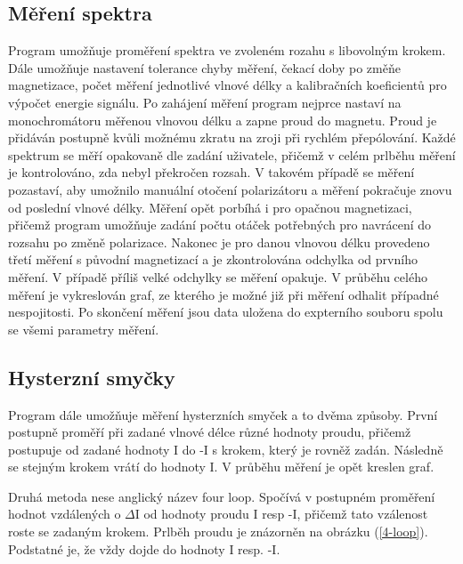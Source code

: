 \documentclass[a4paper,12pt]{article}
\begin{document}
\subsection{Měření spektra}
Program umožňuje proměření spektra ve zvoleném rozahu s libovolným krokem. Dále umožňuje nastavení tolerance chyby měření, čekací doby po změňe magnetizace, počet měření jednotlivé vlnové délky a kalibračních koeficientů pro výpočet energie signálu. Po zahájení měření program nejprce nastaví na monochromátoru měřenou vlnovou délku a zapne proud do magnetu. Proud je přidáván postupně kvůli možnému zkratu na zroji při rychlém přepólování. Každé spektrum se měří opakovaně dle zadání uživatele, přičemž v celém prlběhu měření je kontrolováno, zda nebyl překročen rozsah. V takovém případě se měření pozastaví, aby umožnilo manuální otočení polarizátoru a měření pokračuje znovu od poslední vlnové délky. Měření opět porbíhá i pro opačnou magnetizaci, přičemž program umožňuje zadání počtu otáček potřebných pro navrácení do rozsahu po změně polarizace. Nakonec je pro danou vlnovou délku provedeno třetí měření s původní magnetizací a je zkontrolována odchylka od prvního měření. V případě příliš velké odchylky se měření opakuje. V průběhu celého měření je vykreslován graf, ze kterého je možné již při měření odhalit případné nespojitosti. Po skončení měření jsou data uložena do expterního souboru spolu se všemi parametry měření.

\subsection{Hysterzní smyčky}
Program dále umožňuje měření hysterzních smyček a to dvěma způsoby. První postupně proměří při zadané vlnové délce různé hodnoty proudu, přičemž postupuje od zadané hodnoty I do -I s krokem, který je rovněž zadán. Následně se stejným krokem vrátí do hodnoty I. V průběhu měření je opět kreslen graf.

Druhá metoda nese anglický název four loop. Spočívá v postupném proměření hodnot vzdálených o $\Delta$I od hodnoty proudu I resp -I, přičemž tato vzálenost roste se zadaným krokem. Prlběh proudu je znázorněn na obrázku (\ref{4-loop}). Podstatné je, že vždy dojde do hodnoty I resp. -I.
\end{document}
